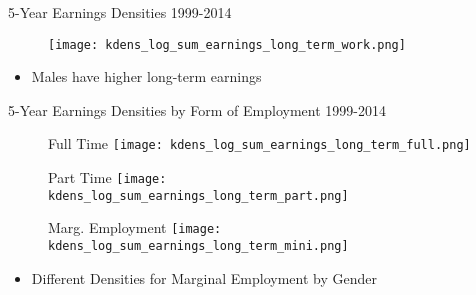 \documentclass[hyperref={bookmarks=false}]{beamer}
\begin{document}
\begin{appendix}
\begin{frame}{5-Year Earnings Densities}
1999-2014
\begin{figure}[!t]
\centering
\begin{minipage}[b]{0.32\textwidth}{}
\centering
\texttt{[image: kdens\_log\_sum\_earnings\_long\_term\_work.png]}
\end{minipage}
\end{figure}
\begin{itemize}
\setlength{\itemsep}{0.7 cm}
\item Males have higher long-term earnings
\end{itemize}
\end{frame}

\begin{frame}{5-Year Earnings Densities by Form of Employment}
1999-2014
\begin{figure}[!t]
\centering
\begin{minipage}[b]{0.32\textwidth}{Full Time}
\centering
\texttt{[image: kdens\_log\_sum\_earnings\_long\_term\_full.png]}
\end{minipage}
\begin{minipage}[b]{0.32\textwidth}{Part Time}
\centering
\texttt{[image: kdens\_log\_sum\_earnings\_long\_term\_part.png]}
\end{minipage}
\begin{minipage}[b]{0.32\textwidth}{Marg. Employment}
\centering
\texttt{[image: kdens\_log\_sum\_earnings\_long\_term\_mini.png]}
\end{minipage}
\end{figure}
\begin{itemize}
\setlength{\itemsep}{0.7 cm}
\item Different Densities for Marginal Employment by Gender
\end{itemize}
\hyperlink{DATA5}{}
\end{frame}



\end{appendix}

%
%
%
%
\end{document}
